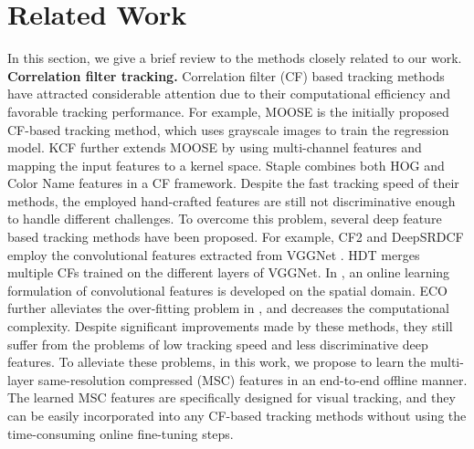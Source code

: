 \documentclass[runningheads]{llncs}
\begin{document}
\section{Related Work}
In this section, we give a brief review to the methods closely related to our work.\\

\noindent \textbf{Correlation filter tracking.} Correlation filter (CF) based tracking methods \cite{DSST,CCOT,KCF} have attracted considerable attention due to their computational efficiency and favorable tracking performance. For example, MOOSE \cite{MOOSE} is the initially proposed CF-based tracking method, which uses grayscale images to train the regression model.  KCF \cite{KCF} further extends MOOSE by using multi-channel features and mapping the input features to a kernel space. Staple \cite{Staple} combines both HOG and Color Name features in a CF framework. Despite the fast tracking speed of their methods, the employed hand-crafted features are still not discriminative enough to handle different challenges. To overcome this problem, several deep feature based tracking methods have been proposed. For example, CF2 \cite{HCF} and DeepSRDCF \cite{DeepSRDCF} employ the convolutional features extracted from VGGNet \cite{VGG-M}. HDT \cite{HDT} merges multiple CFs trained on the different layers of VGGNet. In \cite{CCOT}, an online learning formulation of convolutional features is developed on the spatial domain. ECO \cite{ECO} further alleviates the over-fitting problem in \cite{CCOT}, and decreases the computational complexity. Despite significant improvements made by these methods, they still suffer from the problems of low tracking speed and less discriminative deep features. To alleviate these problems, in this work, we propose to learn the multi-layer same-resolution compressed (MSC) features in an end-to-end offline manner. The learned MSC features are specifically designed for visual tracking, and they can be easily incorporated into any CF-based tracking methods without using the time-consuming online fine-tuning steps. 
 \\
\end{document}
